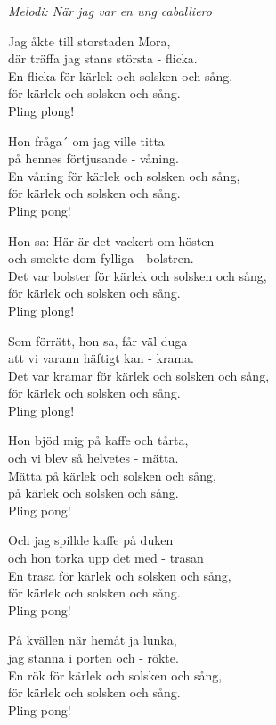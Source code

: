 {\footnotesize\textit{Melodi: När jag var en ung caballiero}}\par
\vspace{10pt}
Jag åkte till storstaden Mora,\\
där träffa jag stans största - flicka.\\
En flicka för kärlek och solsken och sång,\\
för kärlek och solsken och sång.\\
Pling plong!\par
\vspace{10pt}
Hon fråga´ om jag ville titta\\
på hennes förtjusande - våning.\\
En våning för kärlek och solsken och sång,\\
för kärlek och solsken och sång.\\
Pling pong!\par
\vspace{10pt}
Hon sa: Här är det vackert om hösten\\
och smekte dom fylliga - bolstren.\\
Det var bolster för kärlek och solsken och sång,\\
för kärlek och solsken och sång.\\
Pling plong!\par
\vspace{10pt}
Som förrätt, hon sa, får väl duga\\
att vi varann häftigt kan - krama.\\
Det var kramar för kärlek och solsken och sång,\\
för kärlek och solsken och sång.\\
Pling plong!\par
\vspace{10pt}
Hon bjöd mig på kaffe och tårta,\\
och vi blev så helvetes - mätta.\\
Mätta på kärlek och solsken och sång,\\
på kärlek och solsken och sång.\\
Pling pong!\par
\vspace{10pt}
Och jag spillde kaffe på duken\\
och hon torka upp det med - trasan\\
En trasa för kärlek och solsken och sång,\\
för kärlek och solsken och sång.\\
Pling pong!\par
\vspace{10pt}
På kvällen när hemåt ja lunka,\\
jag stanna i porten och - rökte.\\
En rök för kärlek och solsken och sång,\\
för kärlek och solsken och sång.\\
Pling pong!
